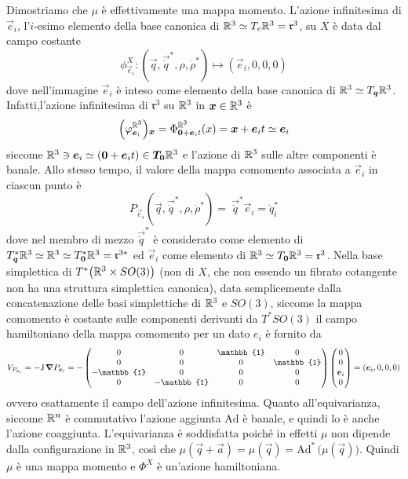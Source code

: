 Dimostriamo che $\mu$ è effettivamente una mappa momento. L'azione infinitesima di $\vec{e}_i$, l'$i$-esimo elemento della base canonica di $\mathbb{R}^3 \simeq T_e \mathbb{R}^3 = \mathfrak{r}^3$, su $X$ è data dal campo costante
\begin{equation*}
\phi_{\vec{e}_i}^X: (\vec{q},\vec{\dot{q}}^*, \rho, \dot{\rho}^*)\longmapsto (\vec{e}_i, 0, 0, 0)
\end{equation*}
dove nell'immagine $\vec{e}_i$ è inteso come elemento della base canonica di $\mathbb{R}^3 \simeq T_{\boldsymbol{q}}\mathbb{R}^3$. Infatti,l'azione infinitesima di $\mathfrak{r}^3$ su $\mathbb{R}^3$ in $\boldsymbol{x} \in \mathbb{R}^3$ è \begin{equation*}
  \Big(\varphi^{\mathbb{R}^3}_{\boldsymbol{e}_i}\Big)\boldsymbol{_x} = \Phi^{\mathbb{R}^3}_{\boldsymbol{0} + \boldsymbol{e}_i t}(x) = \boldsymbol{x} + \boldsymbol{e}_i t \simeq \boldsymbol{e}_i
\end{equation*}
siccome $\mathbb{R}^3 \ni \boldsymbol{e}_i \simeq (\boldsymbol{0}+\boldsymbol{e}_i t) \in \boldsymbol{T_0} \mathbb{R}^3 $ e l'azione di $\mathbb{R}^3$ sulle altre componenti è banale. Allo stesso tempo, il valore della mappa comomento associata a $\vec{e}_i$ in ciascun punto è 
\begin{equation*}
  P_{\vec{e}_i}(\vec{q},\vec{\dot{q}}^*, \rho, \dot{\rho}^*) =\ \vec{\dot{q}}^*\! \vec{e}_i = \dot{q}^*_i
\end{equation*} 
dove nel membro di mezzo $\vec{\dot{q}}^*$ è considerato come elemento di $T^*_{\boldsymbol{q}}\mathbb{R}^3 \simeq \mathbb{R}^3 \simeq T^*_{\boldsymbol{0}}\mathbb{R}^3 = \mathfrak{r}^{3*}$ ed $\vec{e}_i$ come elemento di $\mathbb{R}^3 \simeq T_{\boldsymbol{0}}\mathbb{R}^3 = \mathfrak{r}^3$. Nella base simplettica di $T^*\big(\mathbb{R}^3 \times  SO(3)\big)$ (non di $X$, che non essendo un fibrato cotangente non ha una struttura simplettica canonica), data semplicemente dalla concatenazione delle basi simplettiche di $\mathbb{R}^3$ e $SO(3)$, siccome la mappa comomento è costante sulle componenti derivanti da $T^*SO(3)$ il campo hamiltoniano della mappa comomento per un dato $e_i$ è fornito da \begin{equation*}
V_{P_{\vec{e}_i}} = - \mathsf{J}\, \grad{P_{\vec{e}_i}} = - \begin{pmatrix}
  0 & 0 & \mathbb{1} & 0 \\
  0 & 0 & 0 & \mathbb{1} \\
  -\mathbb{1} & 0 & 0 & 0 \\ 
  0 & -\mathbb{1} & 0 & 0 
\end{pmatrix} \begin{pmatrix}
0 \\ 0 \\ \vec{e}_i \\ 0
\end{pmatrix} = (\vec{e}_i, 0, 0, 0)
\end{equation*} 
ovvero esattamente il campo dell'azione infinitesima. Quanto all'equivarianza, siccome $\mathbb{R}^{n}$ è commutativo l'azione aggiunta $\mathrm{Ad}$ è banale, e quindi lo è anche l'azione coaggiunta. L'equivarianza è soddisfatta poiché in effetti $\mu$ non dipende dalla configurazione in $\mathbb{R}^3$, così che $\mu(\vec{q}+\vec{a}) = \mu(\vec{q}) = \mathrm{Ad}^*\,\big(\mu(\vec{q})\big)$. Quindi $\mu$ è una mappa momento e $\Phi^X$ è un'azione hamiltoniana.

